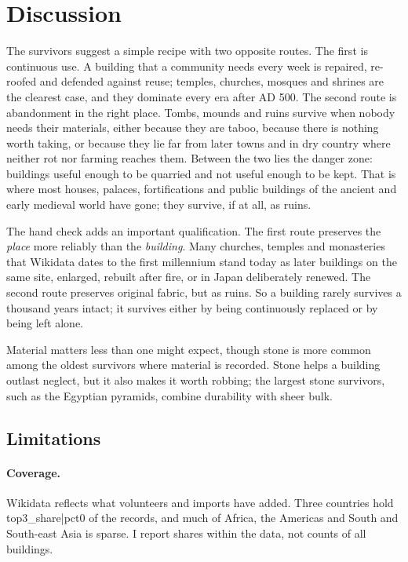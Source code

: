 \documentclass[11pt,a4paper]{article}
\begin{document}
\section{Discussion}

The survivors suggest a simple recipe with two opposite routes. The first is continuous use. A building that a community needs every week is repaired, re-roofed and defended against reuse; temples, churches, mosques and shrines are the clearest case, and they dominate every era after AD 500. The second route is abandonment in the right place. Tombs, mounds and ruins survive when nobody needs their materials, either because they are taboo, because there is nothing worth taking, or because they lie far from later towns and in dry country where neither rot nor farming reaches them. Between the two lies the danger zone: buildings useful enough to be quarried and not useful enough to be kept. That is where most houses, palaces, fortifications and public buildings of the ancient and early medieval world have gone; they survive, if at all, as ruins.

The hand check adds an important qualification. The first route preserves the \emph{place} more reliably than the \emph{building}. Many churches, temples and monasteries that Wikidata dates to the first millennium stand today as later buildings on the same site, enlarged, rebuilt after fire, or in Japan deliberately renewed. The second route preserves original fabric, but as ruins. So a building rarely survives a thousand years intact; it survives either by being continuously replaced or by being left alone.

Material matters less than one might expect, though stone is more common among the oldest survivors where material is recorded. Stone helps a building outlast neglect, but it also makes it worth robbing; the largest stone survivors, such as the Egyptian pyramids, combine durability with sheer bulk.

\subsection{Limitations}

\paragraph{Coverage.} Wikidata reflects what volunteers and imports have added. Three countries hold {{top3_share|pct0}} of the records, and much of Africa, the Americas and South and South-east Asia is sparse. I report shares within the data, not counts of all buildings.
\end{document}
